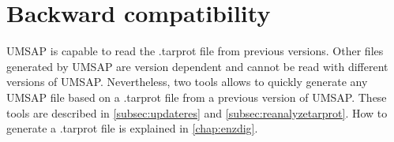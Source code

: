 \section{Backward compatibility}
\label{sec:backcomp}

UMSAP is capable to read the .tarprot file from previous versions. Other files generated by UMSAP are version dependent and cannot be read with different versions of UMSAP. Nevertheless, two tools allows to quickly generate any UMSAP file based on a .tarprot file from a previous version of UMSAP. These tools are described in \autoref{subsec:updateres} and \autoref{subsec:reanalyzetarprot}. How to generate a .tarprot file is explained in \autoref{chap:enzdig}.